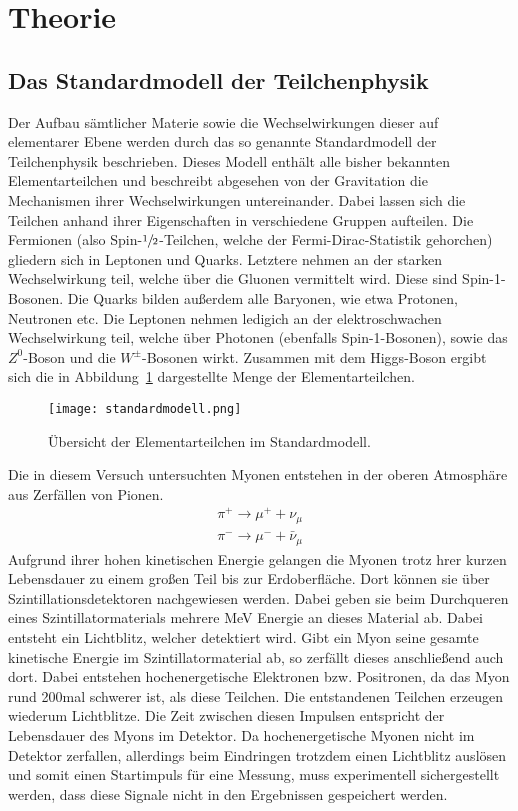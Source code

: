 \section{Theorie}
\label{sec:theorie}

\subsection{Das Standardmodell der Teilchenphysik}

Der Aufbau sämtlicher Materie sowie die Wechselwirkungen dieser auf elementarer Ebene werden durch das so
genannte Standardmodell der Teilchenphysik beschrieben. Dieses Modell enthält alle bisher bekannten
Elementarteilchen und beschreibt abgesehen von der Gravitation die Mechanismen ihrer Wechselwirkungen
untereinander. Dabei lassen sich die Teilchen anhand ihrer Eigenschaften in verschiedene Gruppen aufteilen.
Die Fermionen (also Spin-$\sfrac{1}{2}$-Teilchen, welche der Fermi-Dirac-Statistik gehorchen) gliedern sich in
Leptonen und Quarks. Letztere nehmen an der starken Wechselwirkung teil, welche über die Gluonen vermittelt wird.
Diese sind Spin-1-Bosonen. Die Quarks bilden außerdem alle Baryonen, wie etwa Protonen, Neutronen etc. Die
Leptonen nehmen ledigich an der elektroschwachen Wechselwirkung teil, welche über Photonen (ebenfalls
Spin-1-Bosonen), sowie das $Z^0$-Boson und die $W^{\pm}$-Bosonen wirkt. Zusammen mit dem Higgs-Boson ergibt sich die
in Abbildung~\ref{fig:sm} dargestellte Menge der Elementarteilchen.
%
\begin{figure}[htb]
  \centering
  \texttt{[image: standardmodell.png]}
  \caption{Übersicht der Elementarteilchen im Standardmodell.}
  \label{fig:sm}
\end{figure}
%
Die in diesem Versuch untersuchten Myonen entstehen in der oberen Atmosphäre aus Zerfällen von Pionen.
%
\begin{align}
  \pi^+\rightarrow\mu^++\nu_\mu \\
  \pi^-\rightarrow\mu^-+\bar{\nu}_\mu
\end{align}
%
Aufgrund ihrer hohen kinetischen Energie gelangen die Myonen trotz hrer kurzen Lebensdauer zu einem großen Teil bis zur
Erdoberfläche. Dort können sie über Szintillationsdetektoren nachgewiesen werden. Dabei geben sie beim Durchqueren eines
Szintillatormaterials mehrere MeV Energie an dieses Material ab. Dabei entsteht ein Lichtblitz, welcher detektiert wird.
Gibt ein Myon seine gesamte kinetische Energie im Szintillatormaterial ab, so zerfällt dieses anschließend auch dort.
Dabei entstehen hochenergetische Elektronen bzw. Positronen, da das Myon rund 200mal schwerer ist, als diese Teilchen.
Die entstandenen Teilchen erzeugen wiederum Lichtblitze. Die Zeit zwischen diesen Impulsen entspricht der Lebensdauer
des Myons im Detektor. Da hochenergetische Myonen nicht im Detektor zerfallen, allerdings beim Eindringen trotzdem einen
Lichtblitz auslösen und somit einen Startimpuls für eine Messung, muss experimentell sichergestellt werden, dass diese
Signale nicht in den Ergebnissen gespeichert werden.
%
